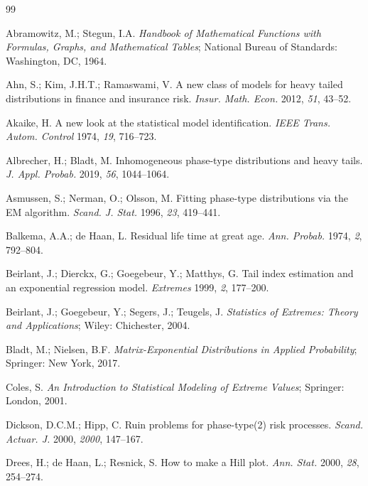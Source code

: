 \begin{thebibliography}{99}

 Abramowitz, M.; Stegun, I.A. \textit{Handbook of Mathematical Functions with Formulas, Graphs, and Mathematical Tables}; National Bureau of Standards: Washington, DC, 1964.

 Ahn, S.; Kim, J.H.T.; Ramaswami, V. A new class of models for heavy tailed distributions in finance and insurance risk. \textit{Insur. Math. Econ.} 2012, \textit{51}, 43--52.

 Akaike, H. A new look at the statistical model identification. \textit{IEEE Trans. Autom. Control} 1974, \textit{19}, 716--723.

 Albrecher, H.; Bladt, M. Inhomogeneous phase-type distributions and heavy tails. \textit{J. Appl. Probab.} 2019, \textit{56}, 1044--1064.

 Asmussen, S.; Nerman, O.; Olsson, M. Fitting phase-type distributions via the EM algorithm. \textit{Scand. J. Stat.} 1996, \textit{23}, 419--441.

 Balkema, A.A.; de Haan, L. Residual life time at great age. \textit{Ann. Probab.} 1974, \textit{2}, 792--804.

 Beirlant, J.; Dierckx, G.; Goegebeur, Y.; Matthys, G. Tail index estimation and an exponential regression model. \textit{Extremes} 1999, \textit{2}, 177--200.

 Beirlant, J.; Goegebeur, Y.; Segers, J.; Teugels, J. \textit{Statistics of Extremes: Theory and Applications}; Wiley: Chichester, 2004.

 Bladt, M.; Nielsen, B.F. \textit{Matrix-Exponential Distributions in Applied Probability}; Springer: New York, 2017.

 Coles, S. \textit{An Introduction to Statistical Modeling of Extreme Values}; Springer: London, 2001.

 Dickson, D.C.M.; Hipp, C. Ruin problems for phase-type(2) risk processes. \textit{Scand. Actuar. J.} 2000, \textit{2000}, 147--167.

 Drees, H.; de Haan, L.; Resnick, S. How to make a Hill plot. \textit{Ann. Stat.} 2000, \textit{28}, 254--274.


\end{thebibliography}
